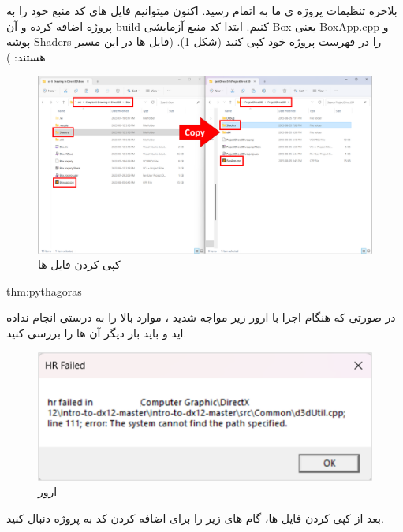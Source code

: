{
    \Large
    \begin{spacing}{1.5}
        بلاخره تنظیمات پروژه ی ما به اتمام رسید. اکنون میتوانیم فایل های کد منبع خود را به پروژه اضافه کرده و آن build کنیم.
        ابتدا کد منبع آزمایشی Box یعنی BoxApp.cpp و پوشه Shaders را در فهرست پروژه خود کپی کنید (شکل \ref{fig:3.Intro.5.8.1}).
        (فایل ها در این مسیر هستند: )

        \begin{figure}[H]
            \centering
            \setlength{\belowcaptionskip}{-10pt}
            \includegraphics[width=\textwidth]{Images/3/3.Intro.5.8.1}
            \caption{کپی کردن فایل ها}
            \label{fig:3.Intro.5.8.1}
        \end{figure}

        \textbf{\vspace{6pt}}
        \begin{theo}{thm:pythagoras}
        {
            \Large
            در صورتی که هنگام اجرا با ارور زیر مواجه شدید ، موارد بالا را به درستی انجام نداده اید و باید بار دیگر آن ها را بررسی کنید.

            \begin{figure}[H]
                \centering
                \setlength{\belowcaptionskip}{-10pt}
                \includegraphics[width=\textwidth]{Images/3/3.Intro.5.8.2}
                \caption{ارور  \textbf{\vspace{12pt}}}
                \label{fig:3.Intro.5.8.2}
            \end{figure}
        }
        \end{theo}
        \textbf{\vspace{6pt}}
        بعد از کپی کردن فایل ها، گام های زیر را برای اضافه کردن کد به پروژه دنبال کنید.


\end{spacing}}
